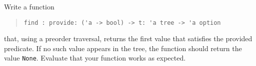Write a function
\begin{quote}
\lstinline{find : provide: ('a -> bool) -> t: 'a tree -> 'a option}
\end{quote}
that, using a preorder traversal, returns the first value that
satisfies the provided predicate. If no such value appears in the
tree, the function should return the value \lstinline{None}. Evaluate
that your function works as expected.
